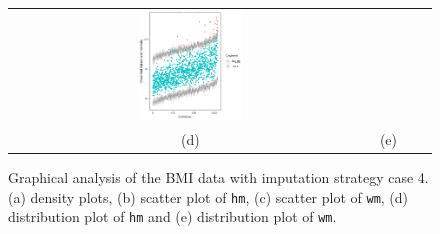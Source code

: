 \begin{figure} [ht!]
\begin{tabular}{cccc}
			\includegraphics[width=0.3\textwidth]{plots/distributioncase4wm} \\
			\textnormal{(d)}  & \textnormal{(e)}  \\[6pt]
		\end{tabular}
		\caption{Graphical analysis of the BMI data with imputation strategy case 4. (a) density plots, (b) scatter plot of \texttt{hm}, (c) scatter plot of \texttt{wm}, (d) distribution plot of \texttt{hm} and (e) distribution plot of \texttt{wm}.}
		\label{fig6_12}
	\end{figure}
	
	
	
	
